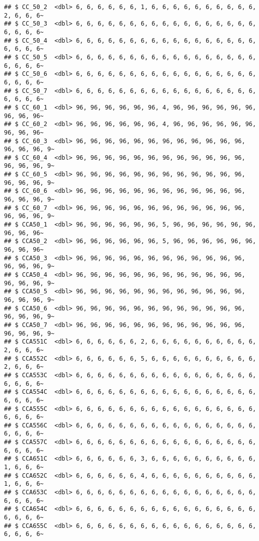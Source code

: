 \documentclass[
]{article}
\begin{document}
\begin{verbatim}
## $ CC_50_2  <dbl> 6, 6, 6, 6, 6, 6, 1, 6, 6, 6, 6, 6, 6, 6, 6, 6, 6, 2, 6, 6, 6~
## $ CC_50_3  <dbl> 6, 6, 6, 6, 6, 6, 6, 6, 6, 6, 6, 6, 6, 6, 6, 6, 6, 6, 6, 6, 6~
## $ CC_50_4  <dbl> 6, 6, 6, 6, 6, 6, 6, 6, 6, 6, 6, 6, 6, 6, 6, 6, 6, 6, 6, 6, 6~
## $ CC_50_5  <dbl> 6, 6, 6, 6, 6, 6, 6, 6, 6, 6, 6, 6, 6, 6, 6, 6, 6, 6, 6, 6, 6~
## $ CC_50_6  <dbl> 6, 6, 6, 6, 6, 6, 6, 6, 6, 6, 6, 6, 6, 6, 6, 6, 6, 6, 6, 6, 6~
## $ CC_50_7  <dbl> 6, 6, 6, 6, 6, 6, 6, 6, 6, 6, 6, 6, 6, 6, 6, 6, 6, 6, 6, 6, 6~
## $ CC_60_1  <dbl> 96, 96, 96, 96, 96, 96, 4, 96, 96, 96, 96, 96, 96, 96, 96, 96~
## $ CC_60_2  <dbl> 96, 96, 96, 96, 96, 96, 4, 96, 96, 96, 96, 96, 96, 96, 96, 96~
## $ CC_60_3  <dbl> 96, 96, 96, 96, 96, 96, 96, 96, 96, 96, 96, 96, 96, 96, 96, 9~
## $ CC_60_4  <dbl> 96, 96, 96, 96, 96, 96, 96, 96, 96, 96, 96, 96, 96, 96, 96, 9~
## $ CC_60_5  <dbl> 96, 96, 96, 96, 96, 96, 96, 96, 96, 96, 96, 96, 96, 96, 96, 9~
## $ CC_60_6  <dbl> 96, 96, 96, 96, 96, 96, 96, 96, 96, 96, 96, 96, 96, 96, 96, 9~
## $ CC_60_7  <dbl> 96, 96, 96, 96, 96, 96, 96, 96, 96, 96, 96, 96, 96, 96, 96, 9~
## $ CCA50_1  <dbl> 96, 96, 96, 96, 96, 96, 5, 96, 96, 96, 96, 96, 96, 96, 96, 96~
## $ CCA50_2  <dbl> 96, 96, 96, 96, 96, 96, 5, 96, 96, 96, 96, 96, 96, 96, 96, 96~
## $ CCA50_3  <dbl> 96, 96, 96, 96, 96, 96, 96, 96, 96, 96, 96, 96, 96, 96, 96, 9~
## $ CCA50_4  <dbl> 96, 96, 96, 96, 96, 96, 96, 96, 96, 96, 96, 96, 96, 96, 96, 9~
## $ CCA50_5  <dbl> 96, 96, 96, 96, 96, 96, 96, 96, 96, 96, 96, 96, 96, 96, 96, 9~
## $ CCA50_6  <dbl> 96, 96, 96, 96, 96, 96, 96, 96, 96, 96, 96, 96, 96, 96, 96, 9~
## $ CCA50_7  <dbl> 96, 96, 96, 96, 96, 96, 96, 96, 96, 96, 96, 96, 96, 96, 96, 9~
## $ CCA551C  <dbl> 6, 6, 6, 6, 6, 6, 2, 6, 6, 6, 6, 6, 6, 6, 6, 6, 6, 2, 6, 6, 6~
## $ CCA552C  <dbl> 6, 6, 6, 6, 6, 6, 5, 6, 6, 6, 6, 6, 6, 6, 6, 6, 6, 2, 6, 6, 6~
## $ CCA553C  <dbl> 6, 6, 6, 6, 6, 6, 6, 6, 6, 6, 6, 6, 6, 6, 6, 6, 6, 6, 6, 6, 6~
## $ CCA554C  <dbl> 6, 6, 6, 6, 6, 6, 6, 6, 6, 6, 6, 6, 6, 6, 6, 6, 6, 6, 6, 6, 6~
## $ CCA555C  <dbl> 6, 6, 6, 6, 6, 6, 6, 6, 6, 6, 6, 6, 6, 6, 6, 6, 6, 6, 6, 6, 6~
## $ CCA556C  <dbl> 6, 6, 6, 6, 6, 6, 6, 6, 6, 6, 6, 6, 6, 6, 6, 6, 6, 6, 6, 6, 6~
## $ CCA557C  <dbl> 6, 6, 6, 6, 6, 6, 6, 6, 6, 6, 6, 6, 6, 6, 6, 6, 6, 6, 6, 6, 6~
## $ CCA651C  <dbl> 6, 6, 6, 6, 6, 6, 3, 6, 6, 6, 6, 6, 6, 6, 6, 6, 6, 1, 6, 6, 6~
## $ CCA652C  <dbl> 6, 6, 6, 6, 6, 6, 4, 6, 6, 6, 6, 6, 6, 6, 6, 6, 6, 1, 6, 6, 6~
## $ CCA653C  <dbl> 6, 6, 6, 6, 6, 6, 6, 6, 6, 6, 6, 6, 6, 6, 6, 6, 6, 6, 6, 6, 6~
## $ CCA654C  <dbl> 6, 6, 6, 6, 6, 6, 6, 6, 6, 6, 6, 6, 6, 6, 6, 6, 6, 6, 6, 6, 6~
## $ CCA655C  <dbl> 6, 6, 6, 6, 6, 6, 6, 6, 6, 6, 6, 6, 6, 6, 6, 6, 6, 6, 6, 6, 6~

\end{verbatim}
\end{document}
